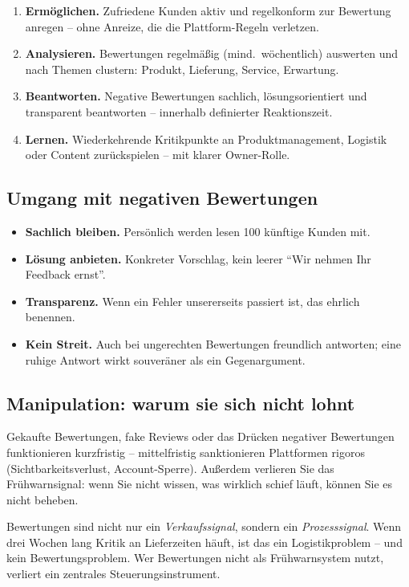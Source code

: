 \documentclass[11pt,a4paper,oneside]{article}
\newcommand{\fachbegriff}[1]{\textbf{#1}}
\begin{document}
\begin{enumerate}
  \item \fachbegriff{Ermöglichen.} Zufriedene Kunden aktiv und regelkonform zur Bewertung anregen -- ohne Anreize, die die Plattform-Regeln verletzen.
  \item \fachbegriff{Analysieren.} Bewertungen regelmäßig (mind.\ wöchentlich) auswerten und nach Themen clustern: Produkt, Lieferung, Service, Erwartung.
  \item \fachbegriff{Beantworten.} Negative Bewertungen sachlich, lösungsorientiert und transparent beantworten -- innerhalb definierter Reaktionszeit.
  \item \fachbegriff{Lernen.} Wiederkehrende Kritikpunkte an Produktmanagement, Logistik oder Content zurückspielen -- mit klarer Owner-Rolle.
\end{enumerate}

\subsection{Umgang mit negativen Bewertungen}

\begin{itemize}
  \item \textbf{Sachlich bleiben.} Persönlich werden lesen 100 künftige Kunden mit.
  \item \textbf{Lösung anbieten.} Konkreter Vorschlag, kein leerer ``Wir nehmen Ihr Feedback ernst''.
  \item \textbf{Transparenz.} Wenn ein Fehler unsererseits passiert ist, das ehrlich benennen.
  \item \textbf{Kein Streit.} Auch bei ungerechten Bewertungen freundlich antworten; eine ruhige Antwort wirkt souveräner als ein Gegenargument.
\end{itemize}

\subsection{Manipulation: warum sie sich nicht lohnt}

Gekaufte Bewertungen, fake Reviews oder das Drücken negativer Bewertungen funktionieren kurzfristig -- mittelfristig sanktionieren Plattformen rigoros (Sichtbarkeitsverlust, Account-Sperre). Außerdem verlieren Sie das Frühwarnsignal: wenn Sie nicht wissen, was wirklich schief läuft, können Sie es nicht beheben.

\begin{merkbox}
Bewertungen sind nicht nur ein \emph{Verkaufssignal}, sondern ein \emph{Prozesssignal}. Wenn drei Wochen lang Kritik an Lieferzeiten häuft, ist das ein Logistikproblem -- und kein Bewertungsproblem. Wer Bewertungen nicht als Frühwarnsystem nutzt, verliert ein zentrales Steuerungsinstrument.
\end{merkbox}
\end{document}
